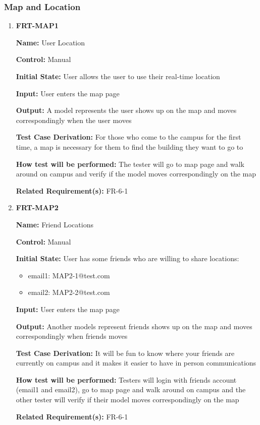 \documentclass[12pt, titlepage]{article}
\begin{document}
\subsubsection{Map and Location}
\begin{enumerate}
\item{\textbf{FRT-MAP1}}

\textbf{Name:} User Location

\textbf{Control:} Manual
					
\textbf{Initial State:} User allows the user to use their real-time location

\textbf{Input:} User enters the map page
					
\textbf{Output:} A model represents the user shows up on the map and moves correspondingly when the user moves

\textbf{Test Case Derivation:} For those who come to the campus for the first time, a map is necessary for them to find the building they want to go to
					
\textbf{How test will be performed:} The tester will go to map page and walk around on campus and verify if the model moves correspondingly on the map

\textbf{Related Requirement(s):} FR-6-1

\item{\textbf{FRT-MAP2}}

\textbf{Name:} Friend Locations

\textbf{Control:} Manual
					
\textbf{Initial State:} User has some friends who are willing to share locations:
\begin{itemize}
\item email1: MAP2-1@test.com
\item email2: MAP2-2@test.com
\end{itemize}

\textbf{Input:} User enters the map page
					
\textbf{Output:} Another models represent friends shows up on the map and moves correspondingly when friends moves

\textbf{Test Case Derivation:} It will be fun to know where your friends are currently on campus and it makes it easier to have in person communications
					
\textbf{How test will be performed:} Testers will login with friends account (email1 and email2), go to map page and walk around on campus and the other tester will verify if their model moves correspondingly on the map

\textbf{Related Requirement(s):} FR-6-1
\end{enumerate}
\end{document}

